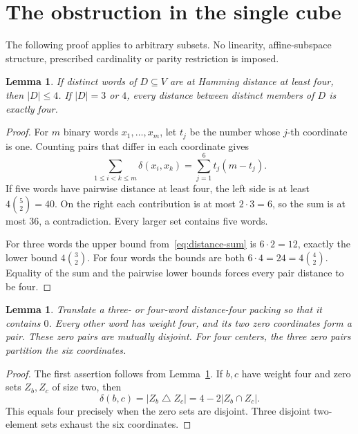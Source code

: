 \documentclass[11pt]{article}
\newtheorem{lemma}[theorem]{Lemma}
\theoremstyle{definition}
\theoremstyle{remark}
\begin{document}
\section{The obstruction in the single cube}\label{sec:factor}
The following proof applies to arbitrary subsets. No linearity,
affine-subspace structure, prescribed cardinality or parity restriction
is imposed.

\begin{lemma}\label{lem:plotkin}
If distinct words of \(D\subseteq V\) are at Hamming distance at least
four, then \(|D|\le4\). If \(|D|=3\) or \(4\), every distance between
distinct members of \(D\) is exactly four.
\end{lemma}
\begin{proof}
For \(m\) binary words \(x_1,\ldots,x_m\), let \(t_j\) be the number
whose \(j\)-th coordinate is one. Counting pairs that differ in
each coordinate gives
\begin{equation}\label{eq:distance-sum}
 \sum_{1\le i<k\le m}\delta(x_i,x_k)
    =\sum_{j=1}^6 t_j(m-t_j).
\end{equation}
If five words have pairwise distance at least four, the left side is
at least \(4\binom52=40\). On the right each contribution is at most
\(2\cdot3=6\), so the sum is at most 36, a contradiction. Every larger
set contains five words.

For three words the upper bound from~\eqref{eq:distance-sum} is
\(6\cdot2=12\), exactly the lower bound \(4\binom32\).
For four words the bounds are both
\(6\cdot4=24=4\binom42\). Equality of the sum and the pairwise lower
bounds forces every pair distance to be four.
\end{proof}

\begin{lemma}\label{lem:zero-pairs}
Translate a three- or four-word distance-four packing so that it
contains \(0\). Every other word has weight four, and its two zero
coordinates form a pair. These zero pairs are mutually disjoint.
For four centers, the three zero pairs partition the six coordinates.
\end{lemma}
\begin{proof}
The first assertion follows from Lemma~\ref{lem:plotkin}. If \(b,c\)
have weight four and zero sets \(Z_b,Z_c\) of size two, then
\[
 \delta(b,c)=|Z_b\mathbin{\triangle} Z_c|
           =4-2|Z_b\cap Z_c|.
\]
This equals four precisely when the zero sets are disjoint. Three
disjoint two-element sets exhaust the six coordinates.
\end{proof}
\end{document}
